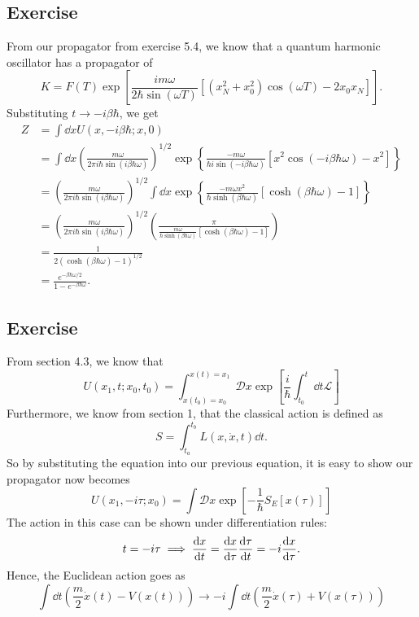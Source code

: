 \subsection{Exercise}
From our propagator from exercise 5.4, we know that a quantum harmonic oscillator has a propagator of 
\begin{equation}
    K=F(T)\exp[\frac{i m \omega}{2\hbar\sin(\omega T)}[(x_N^2+x_0^2)\cos(\omega T)-2x_0x_N]].
\end{equation}
Substituting $t\to -i\beta \hbar$, we get 
\begin{align}
    Z &= \int \dd x U (x, -i\beta \hbar; x, 0) \\
      &= \int \dd x \left(\frac{m\omega}{2\pi i \hbar \sin (i\beta\hbar \omega)}\right)^{1/2}\exp \left\{\frac{-m\omega}{\hbar i\sin (-i\beta\hbar \omega)}[x^2 \cos (-i\beta \hbar \omega) -x^2]\right\} \\
      &= \left(\frac{m\omega}{2\pi i \hbar \sin (i\beta\hbar \omega)}\right)^{1/2}\int \dd x \exp\left\{\frac{-m\omega x^2}{\hbar \sinh (\beta \hbar \omega)}[\cosh (\beta \hbar \omega) - 1]\right\} \\
      &= \left(\frac{m\omega}{2\pi i \hbar \sin (i\beta\hbar \omega)}\right)^{1/2}\left(\frac{\pi}{\frac{m\omega}{\hbar \sinh (\beta \hbar \omega)}[\cosh (\beta \hbar \omega) - 1]}\right) \\
      &= \frac{1}{2(\cosh (\beta \hbar \omega) - 1)^{1/2}} \\
      &= \frac{e^{-\beta \hbar \omega/2}}{1 - e^{-\beta \hbar \omega}}.
\end{align}
\subsection{Exercise}
From section 4.3, we know that 
\begin{equation}
    U (x_1, t; x_0, t_0) = \int_{x(t_0) = x_0}^{x(t) = x_1} \mathcal D x \exp \left[\frac{i}{\hbar}\int_{t_0}^{t}\dd t \mathcal L\right]
\end{equation}
Furthermore, we know from section 1, that the classical action is defined as 
\begin{equation}
    S = \int_{t_a}^{t_b} L (x, \dot x, t) \dd t.
\end{equation}
So by substituting the equation into our previous equation, it is easy to show our propagator now becomes 
\begin{equation}
    U (x_1, -i\tau; x_0) = \int \mathcal D x \exp \left[-\frac{1}{\hbar}S_E [x(\tau)]\right]
\end{equation}
The action in this case can be shown under differentiation rules:
\begin{equation}
    t = -i \tau \implies \dv{x}{t} = \dv{x}{\tau}\dv{\tau}{t} = - i \dv{x}{\tau}.
\end{equation}
Hence, the Euclidean action goes as 
\begin{equation}
    \int \dd t \left( \frac{m}{2}\dot x(t) - V(x(t))\right) \to -i\int \dd t \left(\frac{m}{2}\dot x(\tau) + V(x (\tau))\right)
\end{equation}

